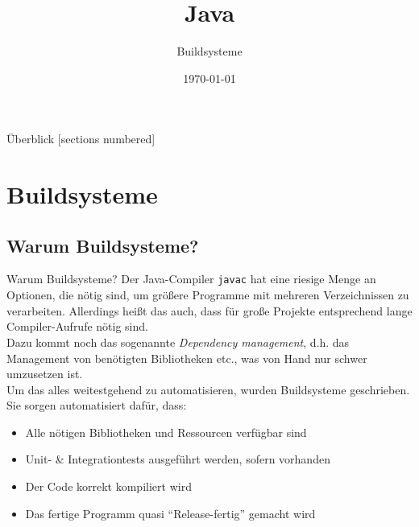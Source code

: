 


\usepackage{csquotes}
\usepackage{dirtree}

\title{Java}
\subtitle{Buildsysteme}
\date{\today}



\begin{frame}
    \titlepage
\end{frame}

\begin{frame}{Überblick}
    [sections numbered]
    \tableofcontents
\end{frame}

\section{Buildsysteme}
\subsection{Warum Buildsysteme?}

\begin{frame}{Warum Buildsysteme?}
    \onslide<+->
    Der Java-Compiler \texttt{javac} hat eine riesige Menge an Optionen, die nötig sind, um größere Programme mit mehreren Verzeichnissen zu verarbeiten.
    Allerdings heißt das auch, dass für große Projekte entsprechend lange Compiler-Aufrufe nötig sind.\\
    \onslide<+->
    Dazu kommt noch das sogenannte \textit{Dependency management}, d.h. das Management von benötigten Bibliotheken etc., was von Hand nur schwer umzusetzen ist.\\
    \onslide<+->
    Um das alles weitestgehend zu automatisieren, wurden Buildsysteme geschrieben. Sie sorgen automatisiert dafür, dass:
    \begin{itemize}[<+->]
        \item Alle nötigen Bibliotheken und Ressourcen verfügbar sind
        \item Unit- \& Integrationtests ausgeführt werden, sofern vorhanden
        \item Der Code korrekt kompiliert wird
        \item Das fertige Programm quasi \enquote{Release-fertig} gemacht wird
    \end{itemize}
\end{frame}

